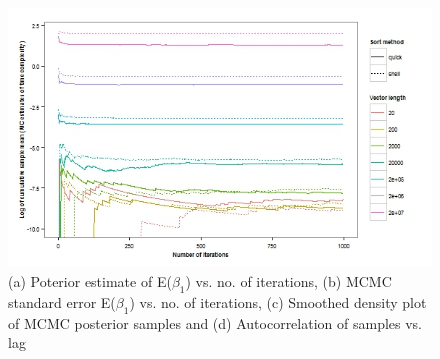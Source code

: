 \documentclass[12pt]{article}
\begin{document}
\begin{enumerate}[label=(\alph*)]
\begin{figure}[H]
\begin{centering}
\includegraphics[scale=1.5]{fig1.jpeg}
\caption{(a) Poterior estimate of E($\beta_1$) vs. no. of iterations, (b) MCMC standard error E($\beta_1$) vs. no. of iterations, (c) Smoothed density plot of MCMC posterior samples and (d) Autocorrelation of samples vs. lag}
\end{centering}
\end{figure}
\end{enumerate}
\end{document}
